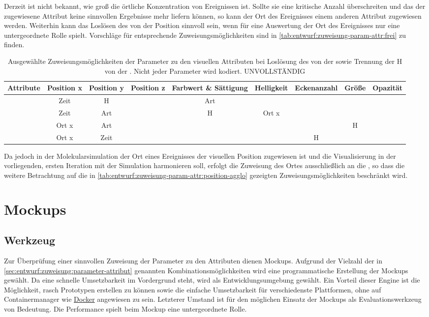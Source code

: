 Derzeit ist nicht bekannt, wie groß die örtliche Konzentration von Ereignissen ist. Sollte sie eine kritische Anzahl überschreiten und das der  zugewiesene Attribut keine sinnvollen Ergebnisse mehr liefern können, so kann der Ort des Ereignisses einem anderen Attribut zugewiesen werden. Weiterhin kann das Loslösen des  von der Position sinnvoll sein, wenn für eine Auswertung der Ort des Ereignisses nur eine untergeordnete Rolle spielt. Vorschläge für entsprechende Zuweisungsmöglichkeiten sind in \autoref{tab:entwurf:zuweisung-param-attr:frei} zu finden.

\begin{table}
	\begin{tabularx}{\textwidth}{@{}CCCCCCCCC@{}}
		\toprule
		Attribute & Position x & Position y & Position z & Farbwert \& Sättigung & Helligkeit & Eckenanzahl & Größe & Opazität \tabularnewline
		\midrule
		& Zeit & H & & Art \tabularnewline
		& Zeit & Art & & H & Ort x \tabularnewline
		& Ort x & Art & & & & & H \tabularnewline
		& Ort x & Zeit & & & & H & \tabularnewline
		\bottomrule
	\end{tabularx}
	\caption{Ausgewählte Zuweisungsmöglichkeiten der Parameter zu den visuellen Attributen bei Loslösung des  von der  sowie Trennung der  H von der . Nicht jeder Parameter wird kodiert. UNVOLLSTÄNDIG}\label{tab:entwurf:zuweisung-param-attr:frei}
\end{table}

Da jedoch in der Molekularsimulation der Ort eines Ereignisses der visuellen Position zugewiesen ist und die Visualisierung in der vorliegenden, ersten Iteration mit der Simulation harmonieren soll, erfolgt die Zuweisung des Ortes ausschließlich an die , so dass die weitere Betrachtung auf die in \autoref{tab:entwurf:zuweisung-param-attr:position-agglo} gezeigten Zuweisungsmöglichkeiten beschränkt wird.

\section{Mockups}\label{sec:mockups}

\subsection{Werkzeug}\label{sec:mockups:werkzeug}
Zur Überprüfung einer sinnvollen Zuweisung der Parameter zu den Attributen dienen Mockups. Aufgrund der Vielzahl der in \autoref{sec:entwurf:zuweisung:parameter-attribut} genannten Kombinationsmöglichkeiten wird eine programmatische Erstellung der Mockups gewählt. Da eine schnelle Umsetzbarkeit im Vordergrund steht, wird  als Entwicklungsumgebung gewählt. Ein Vorteil dieser Engine ist die Möglichkeit, rasch Prototypen erstellen zu können sowie die einfache Umsetzbarkeit für verschiedenste Plattformen, ohne auf Containermanager wie \href{https://www.docker.com/}{Docker} angewiesen zu sein. Letzterer Umstand ist für den möglichen Einsatz der Mockups als Evaluationswerkzeug von Bedeutung. Die Performance spielt beim Mockup eine untergeordnete Rolle.

